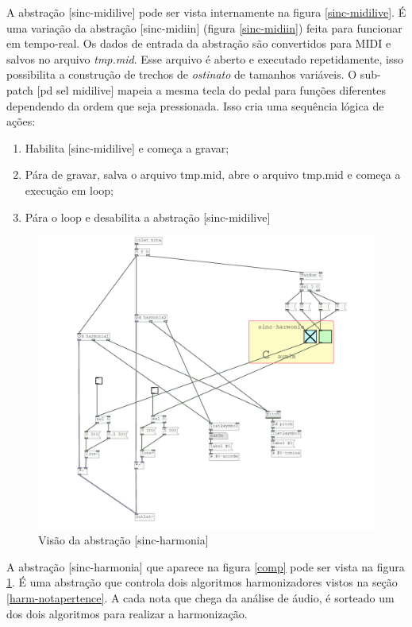 \documentclass{ppgmus}
\begin{document}
A abstração [sinc-midilive] pode ser vista internamente na figura \ref{sinc-midilive}. É uma 
variação da abstração [sinc-midiin] (figura \ref{sinc-midiin}) feita para funcionar em tempo-real.
Os dados de entrada da abstração são convertidos para MIDI e salvos no arquivo \textit{tmp.mid}.
Esse arquivo é aberto e executado repetidamente, isso possibilita a construção de trechos de 
\textit{ostinato} de tamanhos variáveis. O sub-patch [pd sel midilive] mapeia a mesma tecla do
pedal para funções diferentes dependendo da ordem que seja pressionada. Isso cria uma sequência
lógica de ações:

\begin{enumerate}
 \item Habilita [sinc-midilive] e começa a  gravar;
 \item Pára de gravar, salva o arquivo tmp.mid, abre o arquivo tmp.mid e começa a execução em loop;
 \item Pára o loop e desabilita a abstração [sinc-midilive]
\end{enumerate}


\begin{figure}
\includegraphics[scale=.5]{sinc-harmonia}
\caption{Visão da abstração [sinc-harmonia]}
\label{sinc-harmonia}
\end{figure}

A abstração [sinc-harmonia] que aparece na figura \ref{comp} pode ser vista na
figura \ref{sinc-harmonia}. É uma abstração que controla dois algoritmos harmonizadores
vistos na seção \ref{harm-notapertence}. A cada nota que chega da análise de áudio, é sorteado
um dos dois algoritmos para realizar a harmonização.
\end{document}
